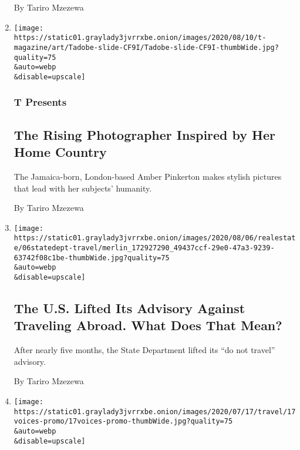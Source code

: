 \begin{enumerate}
  By Tariro Mzezewa
\item
  \href{/2020/08/10/t-magazine/amber-pinkerton-photography.html}{}

  \texttt{[image: https://static01.graylady3jvrrxbe.onion/images/2020/08/10/t-magazine/art/Tadobe-slide-CF9I/Tadobe-slide-CF9I-thumbWide.jpg?quality=75\\\&auto=webp\\\&disable=upscale]}

  \hypertarget{t-presents}{%
  \subsubsection{T Presents}\label{t-presents}}

  \hypertarget{the-rising-photographer-inspired-by-her-home-country}{%
  \subsection{The Rising Photographer Inspired by Her Home
  Country}\label{the-rising-photographer-inspired-by-her-home-country}}

  The Jamaica-born, London-based Amber Pinkerton makes stylish pictures
  that lead with her subjects' humanity.

  By Tariro Mzezewa
\item
  \href{/2020/08/06/travel/USA-Travel-State-Department-warnings.html}{}

  \texttt{[image: https://static01.graylady3jvrrxbe.onion/images/2020/08/06/realestate/06statedept-travel/merlin\_172927290\_49437ccf-29e0-47a3-9239-63742f08c1be-thumbWide.jpg?quality=75\\\&auto=webp\\\&disable=upscale]}

  \hypertarget{the-us-lifted-its-advisory-against-traveling-abroad-what-does-that-mean}{%
  \subsection{The U.S. Lifted Its Advisory Against Traveling Abroad.
  What Does That
  Mean?}\label{the-us-lifted-its-advisory-against-traveling-abroad-what-does-that-mean}}

  After nearly five months, the State Department lifted its ``do not
  travel'' advisory.

  By Tariro Mzezewa
\item
  \href{/2020/07/17/travel/coronavirus-travel-hospitality-workers.html}{}

  \texttt{[image: https://static01.graylady3jvrrxbe.onion/images/2020/07/17/travel/17voices-promo/17voices-promo-thumbWide.jpg?quality=75\\\&auto=webp\\\&disable=upscale]}


\end{enumerate}
